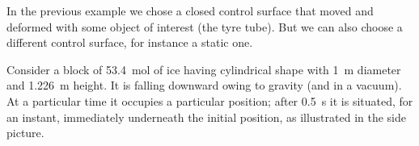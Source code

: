 \documentclass[a4paper,12pt,%
onecolumn,oneside,titlepage,%
british%
]{memoir}
\renewcommand*{\|}[1][]{\nonscript\:#1\vert\nonscript\:\mathopen{}}
\begin{document}
%
In the previous example we chose a closed control surface that moved and deformed with some object of interest (the tyre tube). But we can also choose a different control surface, for instance a static one.

Consider a block of \qty{53.4}{mol} of ice having cylindrical shape with \qty{1}{m} diameter and \qty{1.226}{m} height. It is falling downward owing to gravity (and in a vacuum). At a particular time it occupies a particular position; after \qty{0.5}{s} it is situated, for an instant, immediately underneath the initial position, as illustrated in the side picture.
\end{document}
